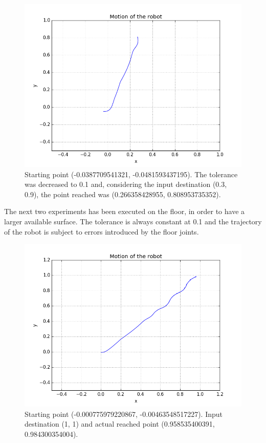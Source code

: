 \documentclass[a4paper,11pt,oneside]{book}
\begin{document}
\begin{figure}[H]
\begin{center}
\includegraphics[width=1\textwidth]{figs/experiments/2}
\caption[Experiment: Destination (0.3, 0.9)]{Starting point (-0.0387709541321, -0.0481593437195). The tolerance was decreased to 0.1 and, considering the input destination (0.3, 0.9), the point reached was (0.266358428955, 0.808953735352).}
\end{center}
\end{figure}

The next two experiments has been executed on the floor, in order to have a larger available surface. The tolerance is always constant at 0.1 and the trajectory of the robot is subject to errors introduced by the floor joints.
\begin{figure}[H]
\begin{center}
\includegraphics[width=1\textwidth]{figs/experiments/3}
\caption[Experiment: Destination (1, 1)]{Starting point (-0.000775979220867, -0.00463548517227). Input destination (1, 1) and actual reached point (0.958535400391, 0.984300354004).}
\end{center}
\end{figure}
\end{document}
